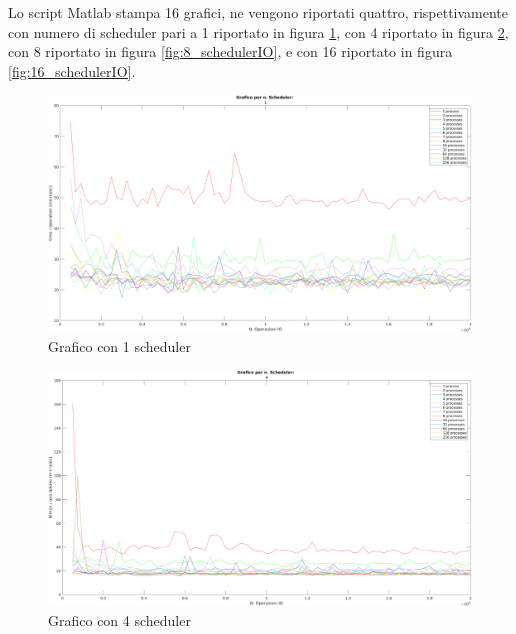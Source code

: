 Lo script Matlab stampa 16 grafici, ne vengono riportati quattro,
rispettivamente con numero di scheduler 
pari a 1 riportato in figura \ref{fig:1_schedulerIO},
con 4 riportato in figura \ref{fig:4_schedulerIO},
con 8 riportato in figura \ref{fig:8_schedulerIO},
e con 16 riportato in figura \ref{fig:16_schedulerIO}.


\begin{figure}[!htp]
    \centering
    \includegraphics[keepaspectratio=true,scale=0.33]{images/matlab/concorrenza_io/1_IO.png}
	\caption{Grafico con 1 scheduler}
  	\label{fig:1_schedulerIO}
\end{figure}

\begin{figure}[!htp]
    \centering
    \includegraphics[keepaspectratio=true,scale=0.33]{images/matlab/concorrenza_io/4_IO.png}
	\caption{Grafico con 4 scheduler}
  	\label{fig:4_schedulerIO}
\end{figure}

